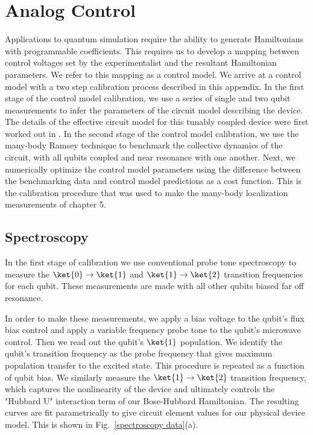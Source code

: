 \chapter[Analog Control]{Analog Control}
\label{ch:analog_control}

Applications to quantum simulation require the ability to generate Hamiltonians with programmable coefficients.
This requires us to develop a mapping between control voltages set by the experimentalist and the resultant Hamiltonian parameters.
We refer to this mapping as a control model.
We arrive at a control model with a two step calibration process described in this appendix.
In the first stage of the control model calibration, we use a series of single and two qubit measurements to infer
the parameters of the circuit model describing the device.  The details of the effective circuit model for this tunably coupled device were first worked out in \cite{Neill2018}.
In the second stage of the control model calibration, we use the many-body Ramsey technique to benchmark the collective
dynamics of the circuit, with all qubits coupled and near resonance with one another.
Next, we numerically optimize the control model parameters using the difference between the benchmarking data and control model predictions as a cost function.
This is the calibration procedure that was used to make the many-body localization measurements of chapter 5.

\section{Spectroscopy \label{sec:spectroscopy}}

In the first stage of calibration we use conventional probe tone spectroscopy to measure
the $\ket{0} \rightarrow \ket{1}$ and $\ket{1} \rightarrow \ket{2}$ transition frequencies for each qubit.
These measurements are made with all other qubits biased far off resonance.

In order to make these measurements, we apply a bias voltage to the qubit's flux bias control
and apply a variable frequency probe tone to the qubit's microwave control.
Then we read out the qubit's $\ket{1}$ population.
We identify the qubit's transition frequency as the probe frequency that gives maximum population transfer to the excited state.
This procedure is repeated as a function of qubit bias.
We similarly measure the $\ket{1} \rightarrow \ket{2}$ transition frequency,
which captures the nonlinearity of the device and ultimately controls the "Hubbard U" interaction term of our Bose-Hubbard Hamiltonian.
The resulting curves are fit parametrically to give circuit element values for our physical device model.
This is shown in Fig.~\ref{spectroscopy data}(a).

